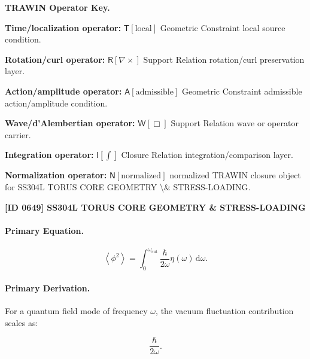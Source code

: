 \par\vspace{0.45\baselineskip}
\noindent\begin{minipage}[t]{\linewidth}
\begingroup
\small
\raggedright
\textbf{TRAWIN Operator Key.}\par
\noindent\textbf{Time/localization operator:} $\mathsf{T}\!\left[\mathrm{local}\right]$ Geometric Constraint local source condition.\par
\noindent\textbf{Rotation/curl operator:} $\mathsf{R}\!\left[\nabla\times\right]$ Support Relation rotation/curl preservation layer.\par
\noindent\textbf{Action/amplitude operator:} $\mathsf{A}\!\left[\mathrm{admissible}\right]$ Geometric Constraint admissible action/amplitude condition.\par
\noindent\textbf{Wave/d'Alembertian operator:} $\mathsf{W}\!\left[\Box\right]$ Support Relation wave or operator carrier.\par
\noindent\textbf{Integration operator:} $\mathsf{I}\!\left[\int\right]$ Closure Relation integration/comparison layer.\par
\noindent\textbf{Normalization operator:} $\mathsf{N}\!\left[\mathrm{normalized}\right]$ normalized TRAWIN closure object for SS304L TORUS CORE GEOMETRY \textbackslash{}\& STRESS-LOADING.\par
\endgroup
\end{minipage}

\clearpage
\noindent\textbf{[ID 0649] SS304L TORUS CORE GEOMETRY \& STRESS-LOADING}\par
\vspace{0.35em}
\paragraph{Primary Equation.}
\begin{equation}
\left\langle\phi^2\right\rangle
=
\int_{0}^{\omega_{\mathrm{cut}}}
\frac{\hbar}{2\omega}
\eta(\omega)
\,\mathrm{d}\omega .
\end{equation}

\paragraph{Primary Derivation.}
For a quantum field mode of frequency $\omega$, the vacuum fluctuation contribution scales as:

\begin{equation}
\frac{\hbar}{2\omega}.
\end{equation}

